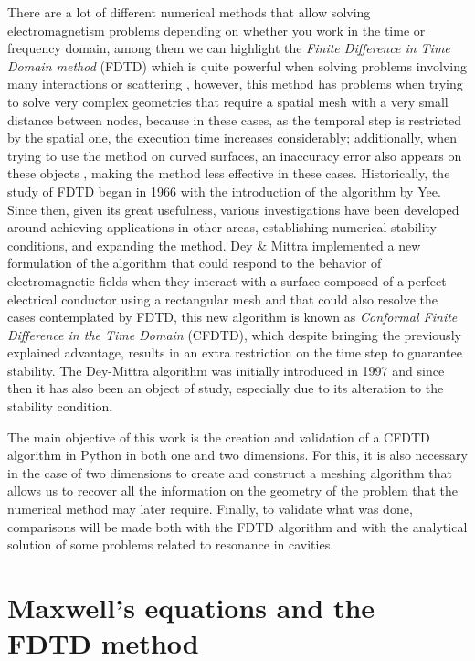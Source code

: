 \documentclass[12pt, oneside]{book}
\begin{document}
There are a lot of different numerical methods that allow solving electromagnetism problems depending on whether you work in the time or frequency domain, among them we can highlight the \textit{Finite Difference in Time Domain method} (FDTD) which is quite powerful when solving problems involving many interactions or scattering \cite{Tekbas2017}, however, this method has problems when trying to solve very complex geometries that require a spatial mesh with a very small distance between nodes, because in these cases, as the temporal step is restricted by the spatial one, the execution time increases considerably; additionally, when trying to use the method on curved surfaces, an inaccuracy error also appears on these objects \cite{Dey1997ALC}, making the method less effective in these cases. Historically, the study of FDTD began in 1966 with the introduction of the algorithm by Yee. Since then, given its great usefulness, various investigations have been developed around achieving applications in other areas, establishing numerical stability conditions, and expanding the method. Dey \& Mittra \cite{DeyMittra1997} implemented a new formulation of the algorithm that could respond to the behavior of electromagnetic fields when they interact with a surface composed of a perfect electrical conductor using a rectangular mesh and that could also resolve the cases contemplated by FDTD, this new algorithm is known as \textit{Conformal Finite Difference in the Time Domain} (CFDTD), which despite bringing the previously explained advantage, results in an extra restriction on the time step to guarantee stability. The Dey-Mittra algorithm was initially introduced in 1997 and since then it has also been an object of study, especially due to its alteration to the stability condition.

The main objective of this work is the creation and validation of a CFDTD algorithm in Python in both one and two dimensions. For this, it is also necessary in the case of two dimensions to create and construct a meshing algorithm that allows us to recover all the information on the geometry of the problem that the numerical method may later require. Finally, to validate what was done, comparisons will be made both with the FDTD algorithm and with the analytical solution of some problems related to resonance in cavities.


\chapter{Maxwell's equations and the FDTD method}
\end{document}
